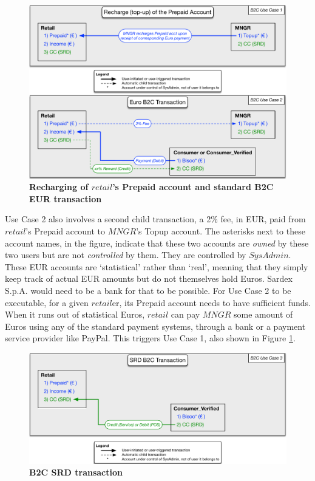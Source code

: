 \begin{figure}[htbp]
\centering
\includegraphics[width=15cm]{Figures/B2C1}
\caption{\small\textbf{Recharging of $retail$'s Prepaid account and standard B2C EUR transaction}}
\label{fig:B2C1}
\end{figure}

Use Case 2 also involves a second child transaction, a 2\% fee, in EUR, paid from $retail$'s Prepaid account to $MNGR$'s Topup account. The asterisks next to these account names, in the figure, indicate that these two accounts are \emph{owned} by these two users but are not \emph{controlled} by them. They are controlled by $SysAdmin$. These EUR accounts are `statistical' rather than `real', meaning that they simply keep track of actual EUR amounts but do not themselves hold Euros. Sardex S.p.A. would need to be a bank for that to be possible. For Use Case 2 to be executable, for a given $retail$er, its Prepaid account needs to have sufficient funds. When it runs out of statistical Euros, $retail$ can pay $MNGR$ some amount of Euros using any of the standard payment systems, through a bank or a payment service provider like PayPal. This triggers Use Case 1, also shown in Figure \ref{fig:B2C1}.

\begin{figure}[h]
\centering
\includegraphics[width=15cm]{Figures/B2C2}
\caption{\small\textbf{B2C SRD transaction}}
\label{fig:B2C2}
\end{figure}

